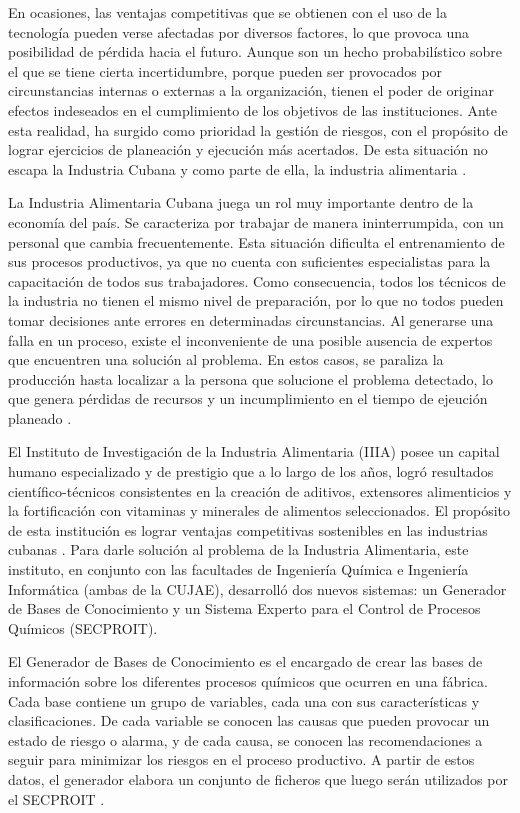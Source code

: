 En ocasiones, las ventajas competitivas que se obtienen con el uso de la tecnología pueden verse afectadas por diversos factores, lo que provoca una posibilidad de pérdida hacia el futuro. Aunque son un hecho probabilístico sobre el que se tiene cierta incertidumbre, porque pueden ser provocados por circunstancias internas o externas a la organización, tienen el poder de originar efectos indeseados en el cumplimiento de los objetivos de las instituciones. 
Ante esta realidad, ha surgido como prioridad la gestión de riesgos, con el propósito de lograr ejercicios de planeación y ejecución más acertados.
De esta situación no escapa la Industria Cubana y como parte de ella, la industria alimentaria \cite{CONVENCION2019}.

La Industria Alimentaria Cubana juega un rol muy importante dentro de la economía del país. Se caracteriza por trabajar de manera ininterrumpida, con un personal que cambia frecuentemente. Esta situación dificulta el entrenamiento de sus procesos productivos, ya que no cuenta con suficientes especialistas para la capacitación de todos sus trabajadores. Como consecuencia, todos los técnicos de la industria no tienen el mismo nivel de preparación, por lo que no todos pueden tomar decisiones ante errores en determinadas circunstancias. Al generarse una falla en un proceso, existe el inconveniente de una posible ausencia de expertos que encuentren una solución al problema. En estos casos, se paraliza la producción hasta localizar a la persona que solucione el problema detectado, lo que genera pérdidas de recursos y un incumplimiento en el tiempo de ejeución planeado \cite{gestorBases}.

El Instituto de Investigación de la Industria Alimentaria (IIIA) posee un capital humano especializado y de prestigio que a lo largo de los años, logró resultados científico-técnicos consistentes en la creación de aditivos, extensores alimenticios y la fortificación con vitaminas y minerales de alimentos seleccionados. El propósito de esta institución es lograr ventajas competitivas sostenibles en las industrias cubanas \cite{anaMailen}. 
Para darle solución al problema de la Industria Alimentaria, este instituto, en conjunto con las facultades de Ingeniería Química e Ingeniería Informática (ambas de la CUJAE), desarrolló dos nuevos sistemas: un Generador de Bases de Conocimiento y  un Sistema Experto para el Control de Procesos Químicos (SECPROIT).

El Generador de Bases de Conocimiento es el encargado de crear las bases de información sobre los diferentes procesos químicos que ocurren en una fábrica. Cada base contiene un grupo de variables, cada una con sus características y clasificaciones. De cada variable se conocen las causas que pueden provocar un estado de riesgo o alarma, y de cada causa, se conocen las recomendaciones a seguir para minimizar los riesgos en el proceso productivo. A partir de estos datos, el generador elabora un conjunto de ficheros que luego serán utilizados por el SECPROIT \cite{anaMailen}.

